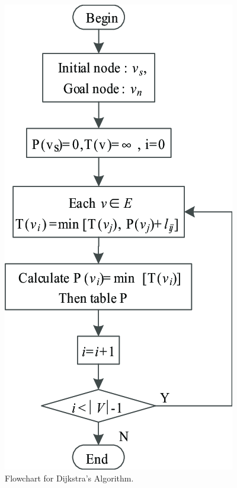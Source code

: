 \documentclass[12pt, a4paper]{report}
\begin{document}
\begin{figure}[h!]
    \centering
    \includegraphics[width=0.5\linewidth]{figures/dijkstra_flowchart.png}
    \caption{Flowchart for Dijkstra's Algorithm.}
    \label{fig:dijkstra_flow}
\end{figure}
\end{document}
